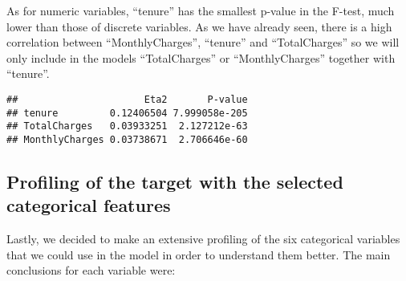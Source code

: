 \documentclass[
]{article}
\newenvironment{Shaded}{\begin{snugshade}}{\end{snugshade}}
\newcommand{\NormalTok}[1]{#1}
\newcommand{\SpecialCharTok}[1]{\textcolor[rgb]{0.81,0.36,0.00}{\textbf{#1}}}
\begin{document}
As for numeric variables, ``tenure'' has the smallest p-value in the
F-test, much lower than those of discrete variables. As we have already
seen, there is a high correlation between ``MonthlyCharges'', ``tenure''
and ``TotalCharges'' so we will only include in the models
``TotalCharges'' or ``MonthlyCharges'' together with ``tenure''.

\begin{Shaded}
\end{Shaded}

\begin{verbatim}
##                      Eta2       P-value
## tenure         0.12406504 7.999058e-205
## TotalCharges   0.03933251  2.127212e-63
## MonthlyCharges 0.03738671  2.706646e-60
\end{verbatim}

\hypertarget{profiling-of-the-target-with-the-selected-categorical-features}{%
\subsection{Profiling of the target with the selected categorical
features}\label{profiling-of-the-target-with-the-selected-categorical-features}}

Lastly, we decided to make an extensive profiling of the six categorical
variables that we could use in the model in order to understand them
better. The main conclusions for each variable were:
\end{document}
